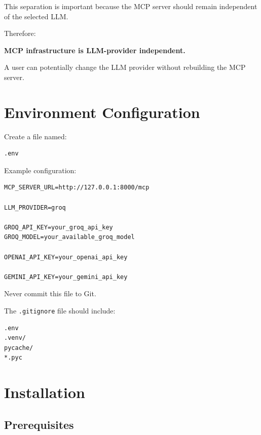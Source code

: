 \documentclass[11pt,a4paper]{article}
\begin{document}
This separation is important because the MCP server should remain
independent of the selected LLM.

Therefore:

\begin{center}
\textbf{MCP infrastructure is LLM-provider independent.}
\end{center}

A user can potentially change the LLM provider without rebuilding
the MCP server.

\section{Environment Configuration}

Create a file named:

\begin{lstlisting}[style=terminal]
.env
\end{lstlisting}

Example configuration:

\begin{lstlisting}[style=env]
MCP_SERVER_URL=http://127.0.0.1:8000/mcp

LLM_PROVIDER=groq

GROQ_API_KEY=your_groq_api_key
GROQ_MODEL=your_available_groq_model

OPENAI_API_KEY=your_openai_api_key

GEMINI_API_KEY=your_gemini_api_key
\end{lstlisting}

Never commit this file to Git.

The \texttt{.gitignore} file should include:

\begin{lstlisting}[style=terminal]
.env
.venv/
pycache/
*.pyc
\end{lstlisting}

\section{Installation}

\subsection{Prerequisites}
\end{document}
